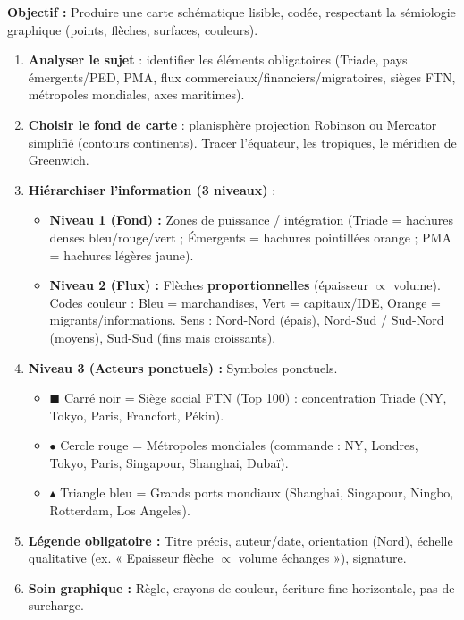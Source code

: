 \documentclass[11pt]{article}
\begin{document}
\begin{methode}
    \textbf{Objectif :} Produire une carte schématique lisible, codée, respectant la sémiologie graphique (points, flèches, surfaces, couleurs).
    \begin{enumerate}
        \item \textbf{Analyser le sujet} : identifier les éléments obligatoires (Triade, pays émergents/PED, PMA, flux commerciaux/financiers/migratoires, sièges FTN, métropoles mondiales, axes maritimes).
        \item \textbf{Choisir le fond de carte} : planisphère projection Robinson ou Mercator simplifié (contours continents). Tracer l'équateur, les tropiques, le méridien de Greenwich.
        \item \textbf{Hiérarchiser l'information (3 niveaux)} :
            \begin{itemize}
                \item \textbf{Niveau 1 (Fond) :} Zones de puissance / intégration (Triade = hachures denses bleu/rouge/vert ; Émergents = hachures pointillées orange ; PMA = hachures légères jaune).
                \item \textbf{Niveau 2 (Flux) :} Flèches \textbf{proportionnelles} (épaisseur $\propto$ volume). Codes couleur : \textcolor{popblue}{Bleu} = marchandises, \textcolor{popgreen}{Vert} = capitaux/IDE, \textcolor{poporange}{Orange} = migrants/informations. Sens : Nord-Nord (épais), Nord-Sud / Sud-Nord (moyens), Sud-Sud (fins mais croissants).
            \end{itemize}
        \item \textbf{Niveau 3 (Acteurs ponctuels) :} Symboles ponctuels.
            \begin{itemize}
                \item $\blacksquare$ Carré noir = Siège social FTN (Top 100) : concentration Triade (NY, Tokyo, Paris, Francfort, Pékin).
                \item $\bullet$ Cercle rouge = Métropoles mondiales (commande : NY, Londres, Tokyo, Paris, Singapour, Shanghai, Dubaï).
                \item $\blacktriangle$ Triangle bleu = Grands ports mondiaux (Shanghai, Singapour, Ningbo, Rotterdam, Los Angeles).
            \end{itemize}
        \item \textbf{Légende obligatoire :} Titre précis, auteur/date, orientation (Nord), échelle qualitative (ex. « Epaisseur flèche $\propto$ volume échanges »), signature.
        \item \textbf{Soin graphique :} Règle, crayons de couleur, écriture fine horizontale, pas de surcharge.
    \end{enumerate}
\end{methode}
\end{document}
